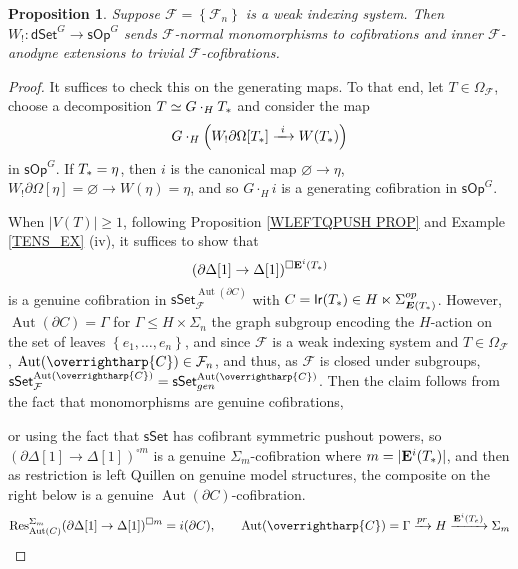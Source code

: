 \documentclass[a4paper,10pt
,draft
]{article}%
\numberwithin{equation}{section}
\numberwithin{figure}{section}
\newtheorem{proposition}[equation]{Proposition}%
\theoremstyle{definition} %
\newcommand{\set}[1]{\left\{#1\right\}}%
\newcommand{\vect}[1]{\text{\overrightharp{\ensuremath{#1}}}}
\newcommand{\sSet}{\ensuremath{\mathsf{sSet}}}%
\newcommand{\sOp}{\ensuremath{\mathsf{sOp}}}%
\newcommand{\dSet}{\mathsf{dSet}}
\DeclareMathOperator{\Aut}{Aut}%
\newcommand{\F}{\ensuremath{\mathcal F}}
\newcommand{\1}{\ensuremath{\mathbbm 1}}%
\begin{document}
\begin{proposition}
      \label{W!_COF_PROP}
      Suppose $\F = \set{\F_n}$ is a weak indexing system.
      Then $W_!: \dSet^G \to \sOp^G$ sends $\F$-normal monomorphisms to cofibrations and inner $\F$-anodyne extensions to trivial $\F$-cofibrations.
\end{proposition}
\begin{proof}
      It suffices to check this on the generating maps.
      To that end, let $T \in \Omega_\F$, choose a decomposition $T \simeq G \cdot_H T_{\**}$ and consider the map
       \begin{equation}
            G \cdot_H \left( W_! \partial \Omega[T_{\**}] \xrightarrow{\ i \ } W(T_{\**}) \right)      
      \end{equation}
      in $\sOp^G$.
      If $T_{\**} = \eta$, then $i$ is the canonical map $\varnothing \to \eta$,
      $W_! \partial \Omega[\eta] = \varnothing \to W(\eta) = \eta$,
      and so $G \cdot_H i$ is a generating cofibration in $\sOp^G$.
      
      When $|V(T)| \geq 1$, following Proposition \ref{WLEFTQPUSH PROP} and Example \ref{TENS_EX} (iv),
      it suffices to show that
      \[
            (\partial \Delta[1] \to \Delta[1])^{\square \mathbf E^i(T_{\**})}
      \]
      is a genuine cofibration in $\sSet^{\Aut(\partial C)}_\F$ with $C = \mathsf{lr}(T_{\**}) \in H \ltimes \Sigma_{\boldsymbol{E}(T_{\**})}^{op}$.
      However, $\Aut(\partial C) = \Gamma$ for $\Gamma \leq H \times \Sigma_n$ the graph subgroup encoding the $H$-action on the set of leaves $\set{e_1, \dots, e_n}$,
      and since $\F$ is a weak indexing system and $T \in \Omega_\F$,
      $\Aut(\vect C) \in \F_n$,
      and thus, as $\F$ is closed under subgroups, $\sSet^{\Aut(\vect C)}_\F = \sSet^{\Aut(\vect C)}_{gen}$.
      Then the claim follows from the fact that monomorphisms are genuine cofibrations,
      {\color{OliveGreen} %
        or using the fact that $\sSet$ has cofibrant symmetric pushout powers,
        so $(\partial \Delta[1] \to \Delta[1])^{\square m}$ is a genuine $\Sigma_m$-cofibration where $m = |\mathbf E^i(T_{\**})|$,
        and then as restriction is left Quillen on genuine model structures,
        the composite on the right below is a genuine $\Aut(\partial C)$-cofibration.
        \[
              \mathrm{Res}^{\Sigma_m}_{\Aut(C)}(\partial \Delta[1] \to \Delta[1])^{\square m} = i(\partial C),
              \qquad
              \Aut(\vect C) = \Gamma \xrightarrow{pr} H \xrightarrow{\mathbf E^i(T_e)} \Sigma_m
        \]

}
\end{proof}
\end{document}
